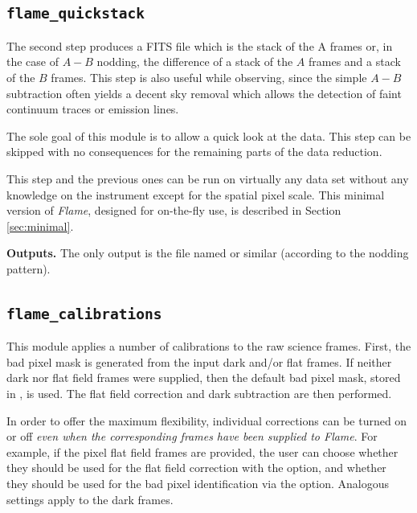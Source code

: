 \documentclass[a4paper]{article}
\newcommand{\flame}{\emph{Flame}}
\begin{document}
\begin{sloppypar}
\subsection{\texttt{flame\_quickstack}}
\label{sec:quickstack}

The second step produces a FITS file which is the stack of the A frames or, in the case of $A-B$ nodding, the difference of a stack of the $A$ frames and a stack of the $B$ frames. This step is also useful while observing, since the simple $A-B$ subtraction often yields a decent sky removal which allows the detection of faint continuum traces or emission lines.

The sole goal of this module is to allow a quick look at the data. This step can be skipped with no consequences for the remaining parts of the data reduction.

This step and the previous ones can be run on virtually any data set without any knowledge on the instrument except for the spatial pixel scale. This minimal version of \flame, designed for on-the-fly use, is described in Section \ref{sec:minimal}.

\medskip
\noindent
\textbf{Outputs.} The only output is the file named  or similar (according to the nodding pattern).


\subsection{\texttt{flame\_calibrations}}
\label{sec:calibrations}

This module applies a number of calibrations to the raw science frames. First, the bad pixel mask is generated from the input dark and/or flat frames. If neither dark nor flat field frames were supplied, then the default bad pixel mask, stored in , is used. The flat field correction and dark subtraction are then performed.

In order to offer the maximum flexibility, individual corrections can be turned on or off \emph{even when the corresponding frames have been supplied to \flame}. For example, if the pixel flat field frames are provided, the user can choose whether they should be used for the flat field correction with the  option, and whether they should be used for the bad pixel identification via the  option. Analogous settings apply to the dark frames.


\end{sloppypar}
\end{document}
